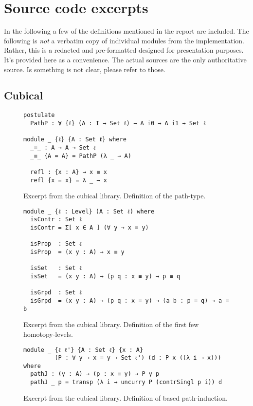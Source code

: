 \chapter{Source code excerpts}
\label{ch:app-sources}
In the following a few of the definitions mentioned in the report are included.
The following is \emph{not} a verbatim copy of individual modules from the
implementation. Rather, this is a redacted and pre-formatted designed for
presentation purposes. It's provided here as a convenience. The actual sources
are the only authoritative source. Is something is not clear, please refer to
those.
\section{Cubical}
\label{sec:app-cubical}
\begin{figure}[h]
\label{fig:path}
\begin{Verbatim}
postulate
  PathP : ∀ {ℓ} (A : I → Set ℓ) → A i0 → A i1 → Set ℓ

module _ {ℓ} {A : Set ℓ} where
  _≡_ : A → A → Set ℓ
  _≡_ {A = A} = PathP (λ _ → A)

  refl : {x : A} → x ≡ x
  refl {x = x} = λ _ → x
\end{Verbatim}
\caption{Excerpt from the cubical library. Definition of the path-type.}
\end{figure}
\clearpage
%
\begin{figure}[h]
\begin{Verbatim}
module _ {ℓ : Level} (A : Set ℓ) where
  isContr : Set ℓ
  isContr = Σ[ x ∈ A ] (∀ y → x ≡ y)

  isProp  : Set ℓ
  isProp  = (x y : A) → x ≡ y

  isSet   : Set ℓ
  isSet   = (x y : A) → (p q : x ≡ y) → p ≡ q

  isGrpd  : Set ℓ
  isGrpd  = (x y : A) → (p q : x ≡ y) → (a b : p ≡ q) → a ≡ b
\end{Verbatim}
\caption{Excerpt from the cubical library. Definition of the first few
  homotopy-levels.}
\end{figure}
%
\begin{figure}[h]
\begin{Verbatim}
module _ {ℓ ℓ'} {A : Set ℓ} {x : A}
         (P : ∀ y → x ≡ y → Set ℓ') (d : P x ((λ i → x))) where
  pathJ : (y : A) → (p : x ≡ y) → P y p
  pathJ _ p = transp (λ i → uncurry P (contrSingl p i)) d
\end{Verbatim}
\clearpage
\caption{Excerpt from the cubical library. Definition of based path-induction.}
\end{figure}
